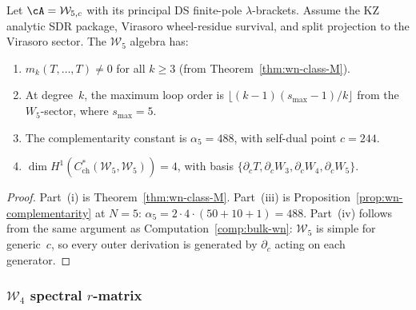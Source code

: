 \begin{proposition}
\label{prop:w5-shadow-depth}
%
Let\/ $\cA=\mathcal W_{5,c}$ with its principal DS finite-pole
$\lambda$-brackets. Assume the KZ analytic SDR package, Virasoro
wheel-residue survival, and split projection to the Virasoro sector.
The $\mathcal{W}_5$ algebra has:
\begin{enumerate}[label=\textup{(\roman*)}]
\item $m_k(T, \ldots, T) \ne 0$ for all $k \ge 3$
 \textup{(}from Theorem~\textup{\ref{thm:wn-class-M})}.
\item At degree~$k$, the maximum loop order is
 $\lfloor (k-1)(s_{\max}-1)/k \rfloor$ from the
 $W_5$-sector, where $s_{\max} = 5$.
\item The complementarity constant is
 $\alpha_5 = 488$, with self-dual point $c = 244$.
\item $\dim H^1(C^*_{\mathrm{ch}}(\mathcal{W}_5,
 \mathcal{W}_5)) = 4$, with basis
 $\{\partial_c T, \partial_c W_3, \partial_c W_4,
 \partial_c W_5\}$.
\end{enumerate}
\end{proposition}

\begin{proof}
Part~(i) is Theorem~\ref{thm:wn-class-M}.
Part~(iii) is Proposition~\ref{prop:wn-complementarity}
at $N = 5$: $\alpha_5 = 2 \cdot 4 \cdot (50 + 10 + 1) = 488$.
Part~(iv) follows from the same argument as
Computation~\ref{comp:bulk-wn}: $\mathcal{W}_5$ is simple
for generic~$c$, so every outer derivation is generated by
$\partial_c$ acting on each generator.
\end{proof}

\subsubsection{$\mathcal{W}_4$ spectral $r$-matrix}

